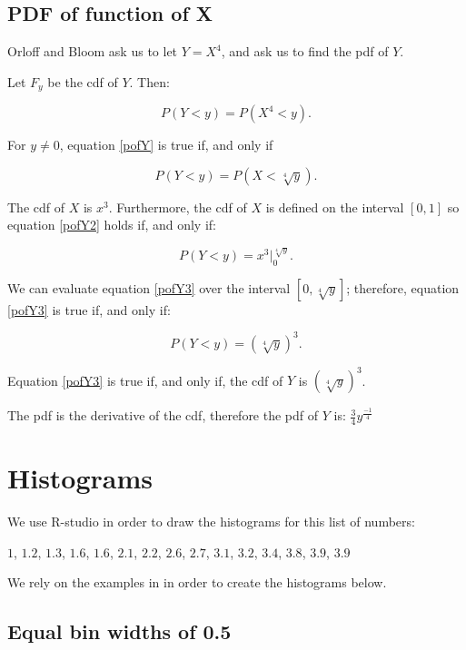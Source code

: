\documentclass[a4paper,11pt]{article}
\begin{document}
\subsection{PDF of function of X}
Orloff and Bloom ask us to let $Y=X^4$, and ask us to find the pdf of $Y$.

Let $F_y$ be the cdf of $Y$. Then:

\begin{equation} \label{pofY}
  P\left(Y < y \right) = P \left( X^4 < y \right).
\end{equation}

For $y \neq 0$, equation \ref{pofY} is true if, and only if

\begin{equation} \label{pofY2}
  P\left(Y < y \right) = P \left( X < \sqrt[4]{y} \right).
\end{equation}

The cdf of $X$ is $x^3$. Furthermore, the cdf of $X$ is defined on
the interval $\left[0, 1 \right]$ so equation \ref{pofY2} holds if,
and only if:

\begin{equation}\label{pofY3}
  P\left(Y < y \right) = x^3 \bigg\rvert_0^{\sqrt[4]{y}}.
\end{equation}

We can evaluate equation \ref{pofY3} over the interval
$\left[ 0, \sqrt[4]{y} \right]$; therefore, equation \ref{pofY3} is
true if, and only if:


\begin{equation}\label{pofY3}
  P\left(Y < y \right) = \left( \sqrt[4]{y}\right)^3 .
\end{equation}

Equation \ref{pofY3} is true if, and only if, the cdf of $Y$ is
$\left( \sqrt[4]{y} \right)^3$.

The pdf is the derivative of the cdf, therefore the pdf of $Y$ is:
$\frac{3}{4} y^{\frac{-1}{4}}$

\section{Histograms}
We use R-studio in order to draw the histograms for this list of numbers:

$1$, $1.2$, $1.3$, $1.6$, $1.6$, $2.1$, $2.2$, $2.6$, $2.7$, $3.1$, $3.2$,
$3.4$, $3.8$, $3.9$, $3.9$

We rely on the examples in \cite{studio3r}  in order to create the histograms
below.
\subsection{Equal bin widths of 0.5}
\end{document}
